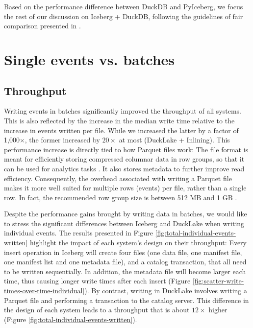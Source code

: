 Based on the performance difference between DuckDB and PyIceberg, we focus the rest of our discussion on Iceberg + DuckDB, following the guidelines of fair comparison presented in \cite{raasveldtFairBenchmarkingConsidered2018}.

\section{Single events vs. batches}

\subsection{Throughput}
Writing events in batches significantly improved the throughput of all systems. This is also reflected by the increase in the median write time relative to the increase in events written per file. While we increased the latter by a factor of 1,000$\times$, the former increased by $20\times$ at most (DuckLake + Inlining). This performance increase is directly tied to how Parquet files work: The file format is meant for efficiently storing compressed columnar data in row groups, so that it can be used for analytics tasks \cite{ParquetMotivation2022}. It also stores metadata to further improve read efficiency. Consequently, the overhead associated with writing a Parquet file makes it more well suited for multiple rows (events) per file, rather than a single row. In fact, the recommended row group size is between 512 MB and 1 GB \cite{ParquetConfigurations2024}.

Despite the performance gains brought by writing data in batches, we would like to stress the significant differences between Iceberg and DuckLake when writing individual events. The results presented in Figure \ref{fig:total-individual-events-written} highlight the impact of each system's design on their throughput: Every insert operation in Iceberg will create four files (one data file, one manifest file, one manifest list and one metadata file), and a catalog transaction, that all need to be written sequentially. In addition, the metadata file will become larger each time, thus causing longer write times after each insert (Figure \ref{fig:scatter-write-times-over-time-individual}). By contrast, writing in DuckLake involves writing a Parquet file and performing a transaction to the catalog server. This difference in the design of each system leads to a throughput that is about $12\times$ higher (Figure \ref{fig:total-individual-events-written}).

